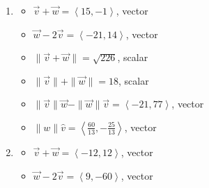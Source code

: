 \documentclass{ximera}
\begin{document}
\begin{enumerate}

\item  

\begin{multicols}{2}

\begin{itemize}

\item  $\vec{v} + \vec{w} = \left<15,-1 \right> $, vector
\item  $\vec{w}  - 2\vec{v}  = \left<-21,14 \right>$, vector

\end{itemize}

\end{multicols}

\begin{multicols}{2}

\begin{itemize}

\item $\| \vec{v} + \vec{w} \| = \sqrt{226}$, scalar
\item  $\| \vec{v} \| + \| \vec{w}\| = 18$, scalar

\end{itemize}

\end{multicols}

\begin{multicols}{2}

\begin{itemize}

\item $\| \vec{v} \| \vec{w} - \| \vec{w} \| \vec{v}  = \left<-21,77\right>$, vector
\item $\|w\| \hat{v}= \left<\frac{60}{13}, -\frac{25}{13} \right>$, vector

\end{itemize}

\end{multicols}

\item  

\begin{multicols}{2}

\begin{itemize}

\item  $\vec{v} + \vec{w} = \left<-12,12 \right> $, vector
\item  $\vec{w}  - 2\vec{v}  = \left<9,-60 \right>$, vector


\end{itemize}
\end{multicols}
\end{enumerate}
\end{document}
